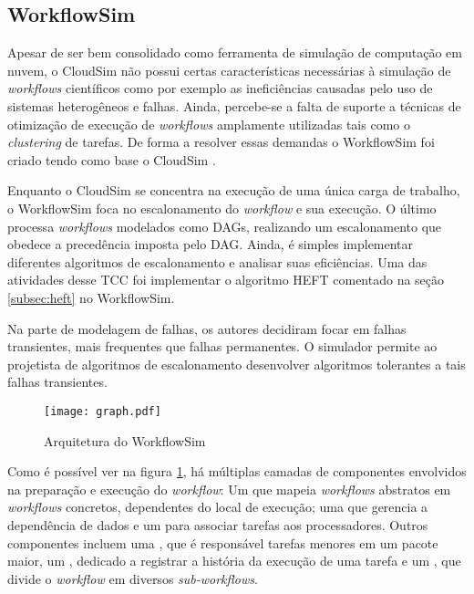 \subsection{WorkflowSim}
\label{subsec:workflowsim}
Apesar de ser bem consolidado como ferramenta de simulação de computação em nuvem,
o CloudSim não possui certas características necessárias à simulação de 
\emph{workflows} científicos como por exemplo as ineficiências causadas pelo
uso de sistemas heterogêneos e falhas. Ainda, percebe-se a falta de suporte a 
técnicas de otimização de execução de \emph{workflows} amplamente utilizadas
tais como o \emph{clustering} de tarefas. De forma a resolver essas demandas
o WorkflowSim foi criado tendo como base o CloudSim \cite{chen:workflowsim}.

Enquanto o CloudSim se concentra na execução de uma única carga de trabalho,
o WorkflowSim foca no escalonamento do \emph{workflow} e sua execução. O último
processa \emph{workflows} modelados como DAGs, realizando um escalonamento que 
obedece a precedência imposta pelo DAG. Ainda, é simples implementar diferentes
algoritmos de escalonamento e analisar suas eficiências. Uma das atividades desse
TCC foi implementar o algoritmo HEFT comentado na seção \ref{subsec:heft} no 
WorkflowSim.

Na parte de modelagem de falhas, os autores decidiram focar em falhas transientes,
mais frequentes que falhas permanentes. O simulador permite ao projetista de
algoritmos de escalonamento desenvolver algoritmos tolerantes a tais falhas 
transientes.

\begin{figure}[ht]
\centering
\texttt{[image: graph.pdf]}
\caption{Arquitetura do WorkflowSim}
\label{fig:arquitetura_workflowsim}
\end{figure}

Como é possível ver na figura \ref{fig:arquitetura_workflowsim}, há múltiplas 
camadas de componentes envolvidos na preparação e execução do \emph{workflow}:
Um  que mapeia \emph{workflows} abstratos em
\emph{workflows} concretos, dependentes do local de execução; uma  que gerencia a dependência de dados e um  para 
associar tarefas aos processadores. Outros componentes incluem uma , que é responsável tarefas menores em um pacote maior, um , dedicado a registrar a história da execução de uma tarefa e um 
, que divide o \emph{workflow} em diversos
\emph{sub-workflows}. 


